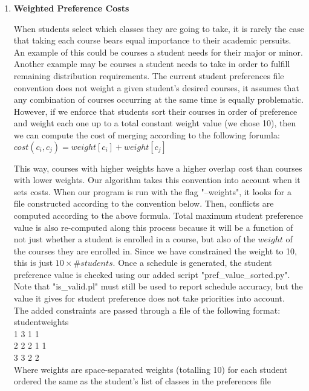\documentclass[11pt, oneside]{article}   	%
\begin{document}
\begin{enumerate}
\item{\textbf{Weighted Preference Costs}}

When students select which classes they are going to take, it is rarely the case that taking each course bears equal importance to their academic persuits. An example of this could be courses a student needs for their major or minor. Another example may be courses a student needs to take in order to fulfill remaining distribution requirements. The current student preferences file convention does not weight a given student's desired courses, it assumes that any combination of courses occurring at the same time is equally problematic. However, if we enforce that students sort their courses in order of preference and weight each one up to a total constant weight value (we chose 10), then we can compute the cost of merging according to the following forumla:\\

$cost(c_i,c_j) = weight[c_i] + weight[c_j]$

This way, courses with higher weights have a higher overlap cost than courses with lower weights. Our algorithm takes this convention into account when it sets costs. When our program is run with the flag "--weights", it looks for a file constructed according to the convention below. Then, conflicts are computed according to the above formula. Total maximum student preference value is also re-computed along this process because it will be a function of not just whether a student is enrolled in a course, but also of the $weight$ of the courses they are enrolled in. Since we have constrained the weight to 10, this is just $10\times \#students$. Once a schedule is generated, the student preference value is checked using our added script "pref\_value\_sorted.py". Note that "is\_valid.pl" must still be used to report schedule accuracy, but the value it gives for student preference does not take priorities into account.\\

The added constraints are passed through a file of the following format:\\

student\qquad weights \\
1 3 1 1 \\
2 2 2 1 1 \\
3 3 2 2  \\

Where weights are space-separated weights (totalling 10) for each student ordered the same as the student's list of classes in the preferences file


\end{enumerate}
\end{document}
